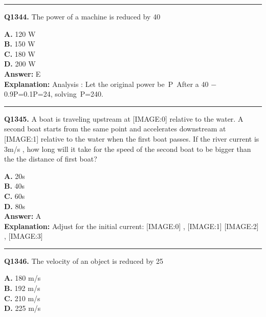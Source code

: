 \documentclass[12pt]{article}
\begin{document}
\hrule
\vspace{1em}


\noindent
\textbf{Q1344.} The power of a machine is reduced by 40%



\textbf{A.} 120 W \\
\textbf{B.} 150 W \\
\textbf{C.} 180 W \\
\textbf{D.} 200 W \\

\textbf{Answer:} E \\
\textbf{Explanation:} Analysis
:
Let the original power be P After a 40%
−
0.9P=0.1P=24, solving P=240.

\hrule
\vspace{1em}


\noindent
\textbf{Q1345.} A boat is traveling upstream at
[IMAGE:0]
relative to the water. A second boat starts from the same point and accelerates downstream at
[IMAGE:1]
relative to the water when the first boat passes. If the river current is 3m/s
, how long will it take for the speed of the second boat to be bigger than the the distance of first boat?



\textbf{A.} 20s \\
\textbf{B.} 40s \\
\textbf{C.} 60s \\
\textbf{D.} 80s \\

\textbf{Answer:} A \\
\textbf{Explanation:} Adjust for the initial current:
[IMAGE:0]
,
[IMAGE:1]
[IMAGE:2]
,
[IMAGE:3]

\hrule
\vspace{1em}


\noindent
\textbf{Q1346.} The velocity of an object is reduced by 25%



\textbf{A.} 180 m/s \\
\textbf{B.} 192 m/s \\
\textbf{C.} 210 m/s \\
\textbf{D.} 225 m/s \\
\end{document}
